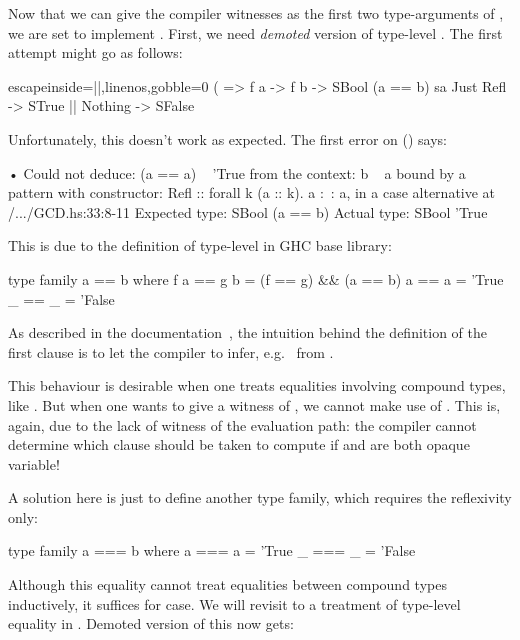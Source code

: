 \documentclass[demotion-paper.tex]{subfiles}
\begin{document}
Now that we can give the compiler witnesses as the first two type-arguments of , we are set to implement .
First, we need \emph{demoted} version of type-level \hask{(==)}.
The first attempt might go as follows:
\begin{code*}{escapeinside=||,linenos,gobble=0}
(%
      => f a -> f b -> SBool (a == b)
sa %
  Just Refl -> STrue |\label{line:trueclause}|
  Nothing -> SFalse
\end{code*}
Unfortunately, this doesn't work as expected.
The first error on  () says:

\begin{repl}
• Could not deduce: (a == a) ~ 'True
  from the context: b ~ a
    bound by a pattern with constructor:
               Refl :: forall k (a :: k). a :~: a,
             in a case alternative
    at /.../GCD.hs:33:8-11
  Expected type: SBool (a == b)
    Actual type: SBool 'True
\end{repl}

This is due to the definition of type-level \hask{(==)} in GHC base library:

\begin{code}
type family a == b where
  f a == g b = (f == g) && (a == b)
  a   == a   = 'True
  _   == _   = 'False
\end{code}
As described in the documentation~\cite{GHC-Team:2021aa}, the intuition behind the definition of the first clause is to let the compiler to infer, e.g.\  from .

This behaviour is desirable when one treats equalities involving compound types, like .
But when one wants to give a witness of , we cannot make use of .
This is, again, due to the lack of witness of the evaluation path: the compiler cannot determine which clause should be taken to compute  if  and  are both opaque variable!

A solution here is just to define another type family, which requires the reflexivity only:
\begin{code}
type family a === b where
  a === a = 'True
  _ === _ = 'False
\end{code}

Although this equality cannot treat equalities between compound types inductively, it suffices for  case.
We will revisit to a treatment of type-level equality in .
Demoted version of this now gets:
\end{document}
